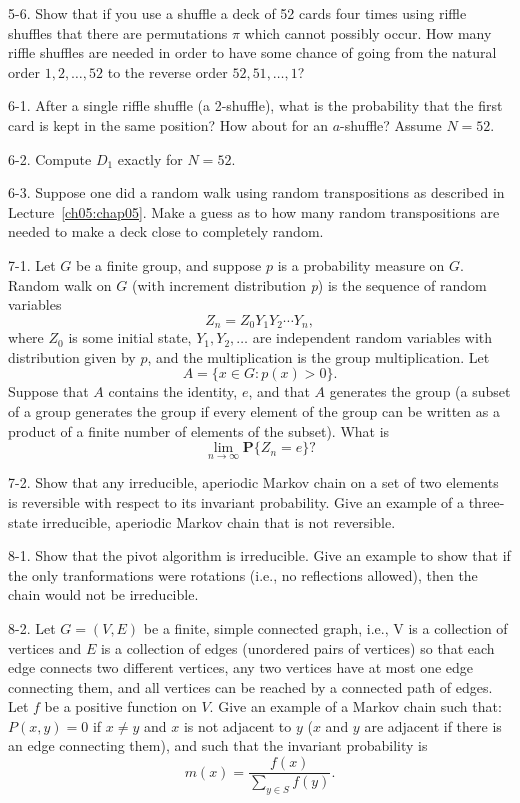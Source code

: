 \documentclass{stml-l}
\theoremstyle{definition}
\numberwithin{equation}{chapter}
\numberwithin{figure}{chapter}
\numberwithin{figure}{section}
\begin{document}
5-6. Show that if you use a shuffle a deck of 52 cards four times
using riffle shuffles that there are permutations $\pi$ which cannot
possibly occur. How many riffle shuffles are needed in order to have
some chance of going from the natural order $1, 2,\ldots, 52$ to the
reverse order $52, 51,\ldots, 1$?

6-1. After a single riffle shuffle (a 2-shuffle), what is the
probability that the first card is kept in the same position? How
about for an $a$-shuffle? Assume $N=52$.

6-2. Compute $D_{1}$ exactly for $N=52$.

6-3. Suppose one did a random walk using random transpositions as
described in Lecture~\ref{ch05:chap05}. Make a guess as to how many
random transpositions are needed to make a deck close to completely
random.

7-1. Let $G$ be a finite group, and suppose $p$ is a probability
measure on $G$. Random walk on $G$ (with increment distribution
\emph{p}) is the sequence of random variables
\begin{equation*}
Z_{n}=Z_{0}Y_{1}Y_{2}\cdots Y_{n},
\end{equation*}
where $Z_{0}$ is some initial state, $Y_{1},Y_{2},\ldots$ are
independent random variables with distribution given by $p$, and the
multiplication is the group multiplication. Let
\begin{equation*}
A=\{x\in G:p(x)>0\}.
\end{equation*}
Suppose that $A$ contains the identity, $e$, and that $A$ generates
the group (a subset of a group generates the group if every element
of the group can be written as a product of a finite number of
elements of the subset). What is
\begin{equation*}
\lim\limits_{n\rightarrow\infty}\mathbf{P}\{Z_{n}=e\}?
\end{equation*}

7-2. Show that any irreducible, aperiodic Markov chain on a set of
two elements is reversible with respect to its invariant
probability. Give an example of a three-state irreducible, aperiodic
Markov chain that is not reversible.

8-1. Show that the pivot algorithm is irreducible. Give an example
to show that if the only tranformations were rotations (i.e., no
reflections allowed), then the chain would not be irreducible.

8-2. Let $G=(V,E)$ be a finite, simple connected graph, i.e.,
$\mathrm{V}$ is a collection of vertices and $E$ is a collection of
edges (unordered pairs of vertices) so that each edge connects two
different vertices, any two vertices have at most one edge
connecting them, and all vertices can be reached by a connected path
of edges. Let $f$ be a positive function on $V$. Give an example of
a Markov chain such that: $P(x,y)=0$ if $x\neq y$ and $x$ is not
adjacent to $y$ ($x$ and $y$ are adjacent if there is an edge
connecting them), and such that the invariant probability is
\begin{equation*}
m(x)=\frac{f(x)}{\sum_{y\in S}f(y)}.
\end{equation*}
\end{document}
